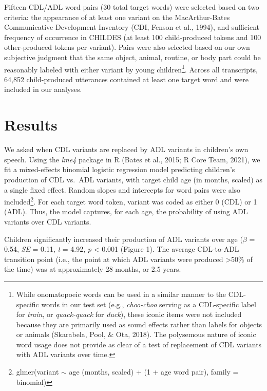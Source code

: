 \documentclass[10pt, letterpaper]{article}
\begin{document}
Fifteen CDL/ADL word pairs (30 total target words) were selected based
on two criteria: the appearance of at least one variant on the
MacArthur-Bates Communicative Development Inventory (CDI, Fenson et al.,
1994), and sufficient frequency of occurrence in CHILDES (at least 100
child-produced tokens and 100 other-produced tokens per variant). Pairs
were also selected based on our own subjective judgment that the same
object, animal, routine, or body part could be reasonably labeled with
either variant by young children\footnote{While onomatopoeic words can
  be used in a similar manner to the CDL-specific words in our test set
  (e.g., \emph{choo-choo} serving as a CDL-specific label for
  \emph{train}, or \emph{quack-quack} for \emph{duck}), these iconic
  items were not included because they are primarily used as sound
  effects rather than labels for objects or animals (Skarabela, Pool, \&
  Ota, 2018). The polysemous nature of iconic word usage does not
  provide as clear of a test of replacement of CDL variants with ADL
  variants over time.}. Across all transcripts, 64,852 child-produced
utterances contained at least one target word and were included in our
analyses.

\hypertarget{results}{%
\section{Results}\label{results}}

We asked when CDL variants are replaced by ADL variants in children's
own speech. Using the \emph{lme4} package in R (Bates et al., 2015; R
Core Team, 2021), we fit a mixed-effects binomial logistic regression
model predicting children's production of CDL vs.~ADL variants, with
target child age (in months, scaled) as a single fixed effect. Random
slopes and intercepts for word pairs were also included\footnote{glmer(variant
  \(\sim\) age (months, scaled) + (1 + age \textbar{} word pair), family
  = binomial)}. For each target word token, variant was coded as either
0 (CDL) or 1 (ADL). Thus, the model captures, for each age, the
probability of using ADL variants over CDL variants.

Children significantly increased their production of ADL variants over
age (\(\beta\) = 0.54, \emph{SE} = 0.11, \emph{t} = 4.92, \emph{p}
\textless{} 0.001 (Figure 1). The average CDL-to-ADL transition point
(i.e., the point at which ADL variants were produced \textgreater50\% of
the time) was at approximately 28 months, or 2.5 years.
\end{document}
